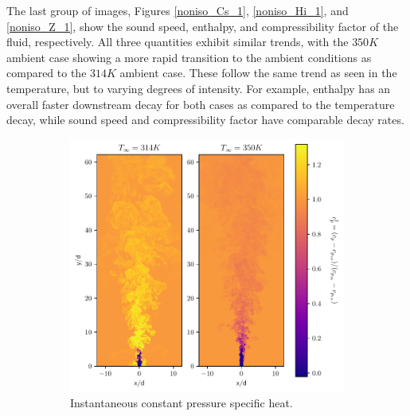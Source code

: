 The last group of images, Figures \ref{noniso_Cs_1}, \ref{noniso_Hi_1}, and \ref{noniso_Z_1}, show the sound speed, enthalpy, and compressibility factor of the fluid, respectively. All three quantities exhibit similar trends, with the $350 K$ ambient case showing a more rapid transition to the ambient conditions as compared to the $314 K$ ambient case. These follow the same trend as seen in the temperature, but to varying degrees of intensity. For example, enthalpy has an overall faster downstream decay for both cases as compared to the temperature decay, while sound speed and compressibility factor have comparable decay rates. 

\begin{figure}[H]
\begin{subfigure}{0.5\textwidth}
	\centering
	\includegraphics[scale=.45]{figures/Plots/vertical/cp_scaled_vert_noniso.pdf}
	\caption{Instantaneous constant pressure specific heat.} \label{noniso_cp_1}
\end{subfigure}
\hfill
\begin{subfigure}{0.5\textwidth}
	\centering

\end{subfigure}
\end{figure}
